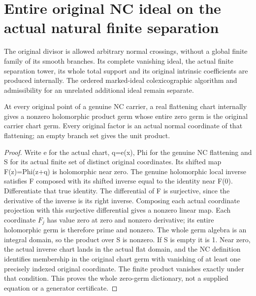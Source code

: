 \section{Entire original NC ideal on the actual natural finite separation}
\label{sec:hironaka-normal-crossings-total-ideal}

The original divisor is allowed arbitrary normal crossings, without a global
finite family of its smooth branches. Its complete vanishing ideal, the actual
finite separation tower, its whole total support and its original intrinsic
coefficients are produced internally. The ordered marked-ideal colexicographic
algorithm and admissibility for an unrelated additional ideal remain separate.

\begin{lemma}
\label{hir:general-nc-original-nonzero-chart-product}
\leanok
At every original point of a genuine NC carrier, a real flattening chart
internally gives a nonzero holomorphic product germ whose entire zero germ is
the original carrier chart germ. Every original factor is an actual normal
coordinate of that flattening; an empty branch set gives the unit product.
\end{lemma}
\begin{proof}
Write e for the actual chart, q=e(x), Phi for the genuine NC flattening and S
for its actual finite set of distinct original coordinates. Its shifted map
F(z)=Phi(z+q) is holomorphic near zero. The genuine holomorphic local inverse
satisfies F composed with its shifted inverse equal to the identity near F(0).
Differentiate that true identity. The differential of F is surjective, since
the derivative of the inverse is its right inverse. Composing each actual
coordinate projection with this surjective differential gives a nonzero
linear map. Each coordinate $F_j$ has value zero at zero and nonzero derivative;
its entire holomorphic germ is therefore prime and nonzero. The whole germ
algebra is an integral domain, so the product over S is nonzero. If S is empty
it is 1. Near zero, the actual inverse chart lands in the actual flat domain,
and the NC definition identifies membership in the original chart germ with
vanishing of at least one precisely indexed original coordinate. The finite
product vanishes exactly under that condition. This proves the whole zero-germ
dictionary, not a supplied equation or a generator certificate.
\end{proof}

